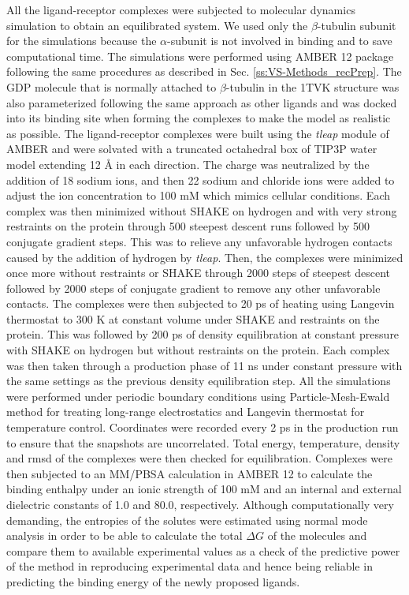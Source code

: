 \documentclass[11pt]{report}
\begin{document}
All the ligand-receptor complexes were subjected to molecular dynamics simulation to obtain an equilibrated system. We used only the $\beta$-tubulin subunit for the simulations because the $\alpha$-subunit is not involved in binding and to save computational time. The simulations were performed using AMBER 12 package
\cite{case2012} following the same procedures as described in Sec. \ref{ss:VS-Methods_recPrep}. 
The GDP molecule that is normally attached to $\beta$-tubulin in the 1TVK structure was also parameterized following the same approach as other ligands and was docked into its binding site when forming the complexes to make the model as realistic as possible. The ligand-receptor complexes were built using the \emph{tleap} module of AMBER and were solvated with a truncated octahedral box of TIP3P water model extending 12 \r{A} in each direction. The charge was neutralized by the addition of 18 sodium ions, and then 22 sodium and chloride ions were added to adjust the ion concentration to 100 mM which mimics cellular conditions.
Each complex was then minimized without SHAKE on hydrogen and with very strong restraints on the protein through 500 steepest descent runs followed by 500 conjugate gradient steps. This was to relieve any unfavorable hydrogen contacts caused by the addition of hydrogen by \emph{tleap}. Then, the complexes were minimized once more without restraints or SHAKE through 2000 steps of steepest descent followed by 2000 steps of conjugate gradient to remove any other unfavorable contacts. The complexes were then subjected to 20 ps of heating using Langevin thermostat to 300 K at constant volume under SHAKE and restraints on the protein. This was followed by 200 ps of density equilibration at constant pressure with SHAKE on hydrogen but without restraints on the protein. Each complex was then taken through a production phase of 11 ns under constant pressure with the same settings as the previous density equilibration step. All the simulations were performed under periodic boundary conditions using Particle-Mesh-Ewald method for treating long-range electrostatics and Langevin thermostat for temperature control. Coordinates were recorded every 2 ps in the production run to ensure that the snapshots are uncorrelated. Total energy, temperature, density and \gls{rmsd} of the complexes were then checked for equilibration. Complexes were then subjected to an MM/PBSA calculation in AMBER 12 to calculate the binding enthalpy under an ionic strength of 100 mM and an internal and external dielectric constants of 1.0 and 80.0, respectively. Although computationally very demanding, the entropies of the solutes were estimated using
normal mode analysis in order to be able to calculate the total $\Delta G$ of the molecules and compare them to available experimental values as a check of the predictive power of the method in reproducing experimental data and hence being reliable in predicting the binding energy of the newly proposed ligands.
\end{document}
